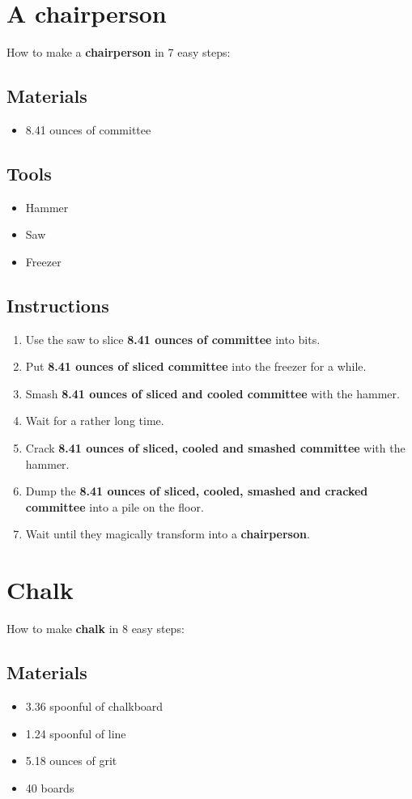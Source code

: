 \documentclass{article}
\begin{document}
\section{A chairperson}How to make a \textbf{chairperson} in 7 easy steps:

\subsection{Materials}\begin{itemize}
\item 
8.41 ounces of committee
\end{itemize}
\subsection{Tools}\begin{itemize}
\item 
Hammer
\item 
Saw
\item 
Freezer
\end{itemize}
\subsection{Instructions}\begin{enumerate}
\item 
Use the saw to slice \textbf{8.41 ounces of committee} into bits.
\item 
Put \textbf{8.41 ounces of sliced committee} into the freezer for a while.
\item 
Smash \textbf{8.41 ounces of sliced and cooled committee} with the hammer.
\item 
Wait for a rather long time.
\item 
Crack \textbf{8.41 ounces of sliced, cooled and smashed committee} with the hammer.
\item 
Dump the \textbf{8.41 ounces of sliced, cooled, smashed and cracked committee} into a pile on the floor.
\item 
Wait until they magically transform into a \textbf{chairperson}.
\end{enumerate}
\newpage
\section{Chalk}How to make \textbf{chalk} in 8 easy steps:

\subsection{Materials}\begin{itemize}
\item 
3.36 spoonful of chalkboard
\item 
1.24 spoonful of line
\item 
5.18 ounces of grit
\item 
40 boards
\end{itemize}
\end{document}
